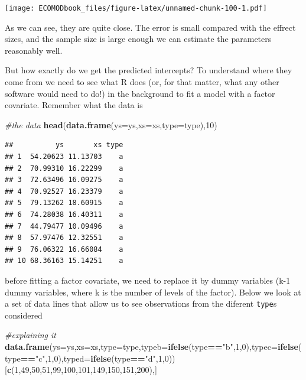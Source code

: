 \documentclass[
]{book}
\newenvironment{Shaded}{\begin{snugshade}}{\end{snugshade}}
\newcommand{\CommentTok}[1]{\textcolor[rgb]{0.56,0.35,0.01}{\textit{#1}}}
\newcommand{\DataTypeTok}[1]{\textcolor[rgb]{0.13,0.29,0.53}{#1}}
\newcommand{\DecValTok}[1]{\textcolor[rgb]{0.00,0.00,0.81}{#1}}
\newcommand{\KeywordTok}[1]{\textcolor[rgb]{0.13,0.29,0.53}{\textbf{#1}}}
\newcommand{\NormalTok}[1]{#1}
\newcommand{\OperatorTok}[1]{\textcolor[rgb]{0.81,0.36,0.00}{\textbf{#1}}}
\newcommand{\StringTok}[1]{\textcolor[rgb]{0.31,0.60,0.02}{#1}}
\begin{document}
\texttt{[image: ECOMODbook\_files/figure-latex/unnamed-chunk-100-1.pdf]}

As we can see, they are quite close. The error is small compared with the effrect sizes, and the sample size is large enough we can estimate the parameters reasonably well.

But how exactly do we get the predicted intercepts? To understand where they come from we need to see what R does (or, for that matter, what any other software would need to do!) in the background to fit a model with a factor covariate. Remember what the data is

\begin{Shaded}
\begin{Highlighting}[]
\CommentTok{#the data}
\KeywordTok{head}\NormalTok{(}\KeywordTok{data.frame}\NormalTok{(}\DataTypeTok{ys=}\NormalTok{ys,}\DataTypeTok{xs=}\NormalTok{xs,}\DataTypeTok{type=}\NormalTok{type),}\DecValTok{10}\NormalTok{)}
\end{Highlighting}
\end{Shaded}

\begin{verbatim}
##          ys       xs type
## 1  54.20623 11.13703    a
## 2  70.99310 16.22299    a
## 3  72.63496 16.09275    a
## 4  70.92527 16.23379    a
## 5  79.13262 18.60915    a
## 6  74.28038 16.40311    a
## 7  44.79477 10.09496    a
## 8  57.97476 12.32551    a
## 9  76.06322 16.66084    a
## 10 68.36163 15.14251    a
\end{verbatim}

before fitting a factor covariate, we need to replace it by dummy variables (k-1 dummy variables, where k is the number of levels of the factor). Below we look at a set of data lines that allow us to see observations from the diferent \texttt{type}s considered

\begin{Shaded}
\begin{Highlighting}[]
\CommentTok{#explaining it}
\KeywordTok{data.frame}\NormalTok{(}\DataTypeTok{ys=}\NormalTok{ys,}\DataTypeTok{xs=}\NormalTok{xs,}\DataTypeTok{type=}\NormalTok{type,}\DataTypeTok{typeb=}\KeywordTok{ifelse}\NormalTok{(type}\OperatorTok{==}\StringTok{"b"}\NormalTok{,}\DecValTok{1}\NormalTok{,}\DecValTok{0}\NormalTok{),}\DataTypeTok{typec=}\KeywordTok{ifelse}\NormalTok{(type}\OperatorTok{==}\StringTok{"c"}\NormalTok{,}\DecValTok{1}\NormalTok{,}\DecValTok{0}\NormalTok{),}\DataTypeTok{typed=}\KeywordTok{ifelse}\NormalTok{(type}\OperatorTok{==}\StringTok{"d"}\NormalTok{,}\DecValTok{1}\NormalTok{,}\DecValTok{0}\NormalTok{))[}\KeywordTok{c}\NormalTok{(}\DecValTok{1}\NormalTok{,}\DecValTok{49}\NormalTok{,}\DecValTok{50}\NormalTok{,}\DecValTok{51}\NormalTok{,}\DecValTok{99}\NormalTok{,}\DecValTok{100}\NormalTok{,}\DecValTok{101}\NormalTok{,}\DecValTok{149}\NormalTok{,}\DecValTok{150}\NormalTok{,}\DecValTok{151}\NormalTok{,}\DecValTok{200}\NormalTok{),]}
\end{Highlighting}
\end{Shaded}
\end{document}
